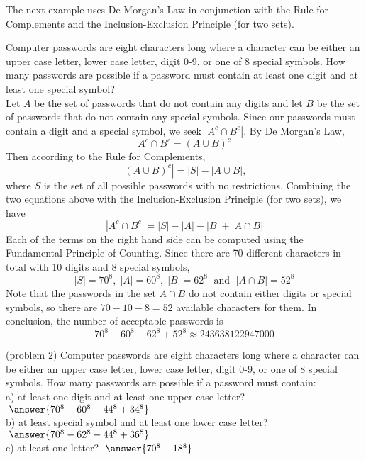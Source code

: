 \documentclass[handout]{ximera}
\begin{document}
The next example uses De Morgan's Law in conjunction with the Rule for Complements and the 
Inclusion-Exclusion Principle (for two sets).

\begin{example}[example 2]
Computer passwords are eight characters long where a character can be either an upper case letter, 
lower case letter, digit 0-9, or one of 8 special symbols. 
How many passwords are possible if a password must contain at least one digit and at least one special symbol?\\

Let $A$ be the set of passwords that do not contain any digits and let $B$ be the set of passwords that do not
contain any special symbols. Since our passwords must contain a digit and a special symbol, we seek $|A^c \cap B^c|$.
By De Morgan's Law, 
\[
A^c \cap B^c = (A \cup B)^c
\]
Then according to the Rule for Complements,
\[
|(A \cup B)^c| = |S| - |A \cup B|,
\]
where $S$ is the set of all possible passwords with no restrictions. 
Combining the two equations above with the Inclusion-Exclusion Principle (for two sets), we have
\[
|A^c \cap B^c| = |S| - |A| - |B| + |A\cap B|
\]
Each of the terms on the right hand side can be computed using the Fundamental Principle of Counting. Since there are
70 different characters in total with 10 digits and 8 special symbols,
\[
|S| = 70^8, \; |A| = 60^8, \; |B| = 62^8 \; \text{ and } \; |A\cap B| = 52^8
\]
Note that the passwords in the set $A \cap B$ do not contain either digits or special symbols, so there are $70-10-8 = 52$
available characters for them. In conclusion, the number of acceptable passwords is
\[
70^8 - 60^8 - 62^8 + 52^8 \approx 243638122947000
\]

\end{example}

\begin{problem}(problem 2)
Computer passwords are eight characters long where a character can be either an upper case letter, 
lower case letter, digit 0-9, or one of 8 special symbols. 
How many passwords are possible if a password must contain:\\
a) at least one digit and at least one upper case letter? $\; \answer{70^8 - 60^8 - 44^8 + 34^8}$\\
b) at least special symbol and at least one lower case letter? $\; \answer{70^8 - 62^8 - 44^8 + 36^8}$\\
c) at least one letter? $\; \answer{70^8 - 18^8}$\\
\end{problem}
\end{document}
